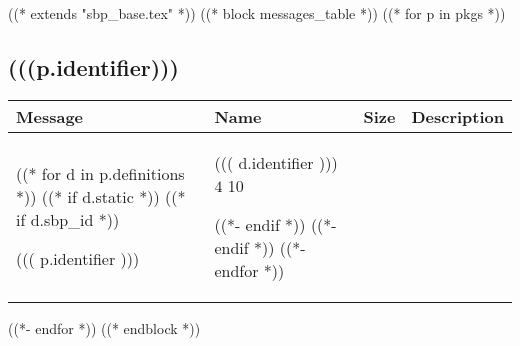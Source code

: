 ((* extends "sbp_base.tex" *))
((* block messages_table *))
((* for p in pkgs *))

\subsection{(((p.identifier)))}

\begin{table}[h]
  \centering
  \begin{tabular}{llll}
    \toprule
    Message & Name & Size & Description \\
    \midrule
    ((* for d in p.definitions *))
    ((* if d.static *))
    ((* if d.sbp_id *))

    ((( p.identifier ))) & ((( d.identifier ))) $ 4 $ 10

    ((*- endif *))
    ((*- endif *))
    ((*- endfor *))
    \bottomrule
  \end{tabular}
\end{table}

((*- endfor *))
((* endblock *))
